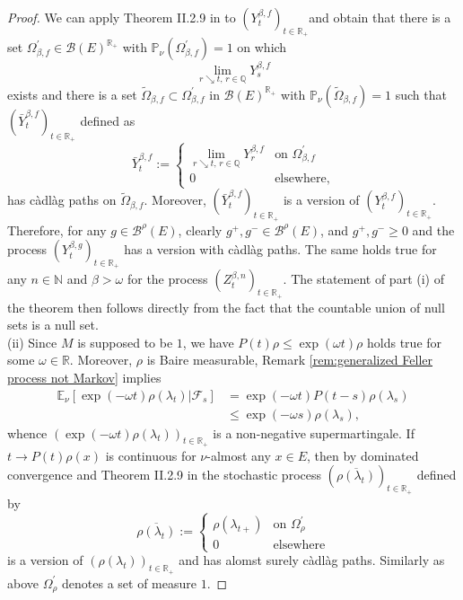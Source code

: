 \documentclass[a4paper,12pt]{article}
\theoremstyle{definition}
\theoremstyle{remark}
\numberwithin{equation}{section}
\numberwithin{theorem}{section}
\begin{document}
\begin{proof}
We can apply Theorem II.2.9 in \cite{ReY}
to $\left(Y_{t}^{\beta,f}\right)_{t\in\mathbb{R}_{+}}$and obtain
that there is a set $\Omega_{\beta,f}^{'}\in\mathcal{B}(E)^{\mathbb{R}_{+}}$
with $\mathbb{P}_{\nu}\left(\Omega_{\beta,f}^{'}\right)=1$ on
which
\[
\underset{r\searrow t,\,r\in\mathbb{Q}}{\lim}Y_{s}^{\beta,f}
\]
 exists and there is a set $\tilde{\Omega}_{\beta,f}\subset\Omega_{\beta,f}^{'}$
in $\mathcal{B}(E)^{\mathbb{R}_{+}}$ with $\mathbb{P}_{\nu}\left(\tilde{\Omega}_{\beta,f}\right)=1$
such that $\left(\bar{Y}_{t}^{\beta,f}\right)_{t\in\mathbb{R}_{+}}$
defined as 
\[
\bar{Y}_{t}^{\beta,f}:=\begin{cases}
\underset{r\searrow t,\,r\in\mathbb{Q}}{\lim}Y_{r}^{\beta,f} & \text{on }\Omega_{\beta,f}^{'}\\
0 & \text{elsewhere},
\end{cases}
\]
has càdlàg paths on $\tilde{\Omega}_{\beta,f}.$ Moreover, $\left(\bar{Y}_{t}^{\beta,f}\right)_{t\in\mathbb{R}_{+}}$ is a version of $\left(Y_{t}^{\beta,f}\right)_{t\in\mathbb{R}_{+}}$. Therefore, for any $g\in\mathcal{\mathscr{B}}^{\rho}(E)$,
clearly $g^{+},g^{-}\in\mathcal{\mathscr{B}}^{\rho}(E)$, and $g^{+},g^{-}\geq0$
and the process $\left(Y_{t}^{\beta,g}\right)_{t\in\mathbb{R}_{+}}$ has a version with càdlàg paths. The same holds true for any $n\in \mathbb{N}$ and $\beta>\omega$  for the process $\left(Z_{t}^{\beta,n}\right)_{t\in\mathbb{R}_{+}}$.
The statement of part (i) of the theorem then follows directly from the fact that the countable union of null sets is a null set. \\



(ii) Since $M$ is supposed to be $1$, we have $P(t)\rho\leq\exp\left(\omega t\right)\rho$ holds true for some $\omega\in\mathbb{R}$. Moreover, 
 $\rho$ is Baire measurable, Remark \ref{rem:generalized Feller process not Markov} implies 
\begin{align*}
\mathbb{E}_{\nu}\left[\left.\exp\left(-\omega t\right)\rho(\lambda_{t})\right|\mathcal{F}_{s}\right] & =\exp\left(-\omega t\right)P(t-s)\rho(\lambda_{s})\\
 & \leq\exp\left(-\omega s\right)\rho(\lambda_{s}),
\end{align*}
whence $\left(\exp\left(-\omega t\right)\rho(\lambda_{t})\right)_{t\in\mathbb{R}_{+}}$
is a non-negative supermartingale. 
If $t\rightarrow P(t)\rho(x)$ is continuous for $\nu$-almost any $x\in E$, then by dominated convergence and Theorem II.2.9 in \cite{ReY} the stochastic process $\left(\overline{\rho(\lambda_{t})}\right)_{t\in\mathbb{R}_{+}}$
defined by
\[
\overline{\rho(\lambda_{t})}:=\begin{cases}
\rho(\lambda_{t+}) & \text{on }\Omega_{\rho}^{'}\\
0 & \text{elsewhere}
\end{cases}
\]
is a version of $\left(\rho(\lambda_{t})\right)_{t\in\mathbb{R}_{+}}$ and has alomst surely càdlàg paths. Similarly as above $\Omega_{\rho}^{'}$ denotes a set of measure $1$.



\end{proof}
\end{document}
